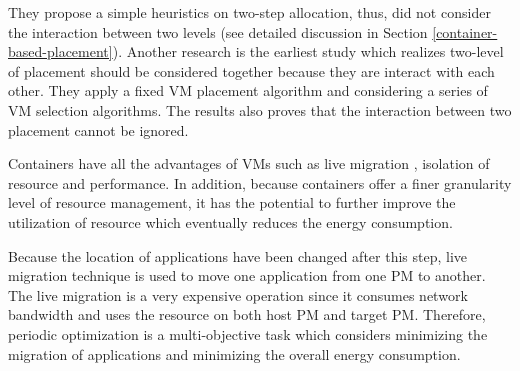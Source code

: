  They propose a simple heuristics on two-step allocation, thus, did not consider the interaction between two levels (see detailed discussion in Section \ref{container-based-placement}). 
Another research \cite{Mann:2016hx} is the earliest study which realizes two-level of placement should be considered together because they are interact with each other. They apply a fixed VM placement algorithm and considering a series of VM selection algorithms. The results also proves that the interaction between two placement cannot be ignored. 

 Containers have all the advantages of VMs such as live migration \cite{Clark:2005uda}, isolation of resource and performance. In addition, because containers offer a finer granularity level of resource management, it has the potential to further improve the utilization of resource which eventually reduces the energy consumption. 

\vspace{5mm}


 Because the location of applications have been changed after this step, live migration technique is used to move one application from one PM to another. The live migration is a very expensive operation since it consumes network bandwidth and uses the resource on both host PM and target PM. Therefore, periodic optimization is a multi-objective task which considers minimizing the migration of applications and minimizing the overall energy consumption. 

